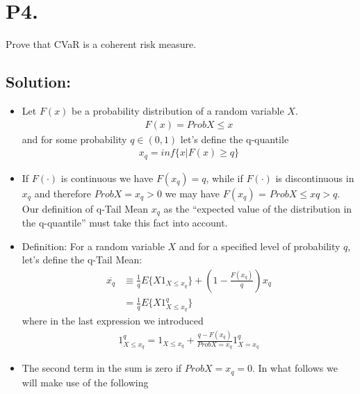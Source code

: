 \documentclass{article}
\theoremstyle{definition}
\theoremstyle{definition}
\theoremstyle{remark}
\begin{document}
\section*{P4.}
Prove that CVaR is a coherent risk measure.
\subsection*{Solution:}
\begin{itemize}
    \item Let $F(x)$ be a probability distribution of a random variable $X$.
    \begin{equation*}
        \begin{aligned}
            F(x) = Prob{X \leq x} 
        \end{aligned}
    \end{equation*}
    and for some probability $q \in (0, 1)$ let’s define the q-quantile
    \begin{equation*}
        \begin{aligned}
            x_q = inf\{x|F(x) \geq q\}
        \end{aligned}
    \end{equation*}
    \item If $F(·)$ is continuous we have $F(x_q) = q$, while if $F(·)$ is discontinuous in $x_q$ and therefore $Prob{X = x_q} > 0$
    we may have $F(x_q)$ = $Prob{X \leq xq} > q$. Our definition of q-Tail Mean $x_q$ as the “expected value of the
    distribution in the q-quantile” must take this fact into account.
    \item Definition: For a random variable $X$ and for a specified level of probability $q$, let’s define the q-Tail Mean:
    \begin{equation*}
        \begin{aligned}
            \overline{x_q} & \equiv \frac{1}{q} E\{X 1_{X\leq x_q} \}	
            + (1 -\frac{F(x_q)}{q})x_q \\
            & =\frac{1}{q} E\{X 1_{X\leq x_q}^{q} \}
        \end{aligned}
    \end{equation*}  
    where in the last expression we introduced
    \begin{equation*}
        \begin{aligned}
            1_{X\leq x_q}^{q} = 1_{X\leq x_q} + \frac{q-F(x_q)}{Prob{X = x_q}}1_{X = x_q}^{q}
        \end{aligned}
    \end{equation*}  
    \item The second term in the sum is zero if $Prob{X = x_q} = 0$. In what follows we will make use of the following

\end{itemize}
\end{document}
